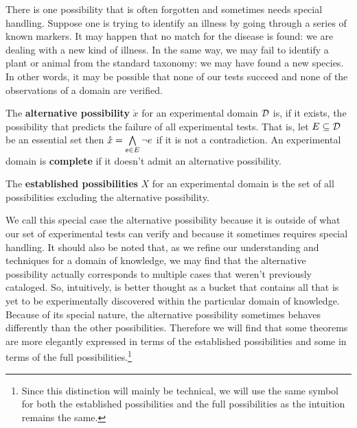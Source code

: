 \documentclass[11pt,letterpaper,fleqn]{memoir} %
\begin{document}
There is one possibility that is often forgotten and sometimes needs special handling. Suppose one is trying to identify an illness by going through a series of known markers. It may happen that no match for the disease is found: we are dealing with a new kind of illness. In the same way, we may fail to identify a plant or animal from the standard taxonomy: we may have found a new species. In other words, it may be possible that none of our tests succeed and none of the observations of a domain are verified.

\begin{mathSection}
	\begin{prop}
		The \textbf{alternative possibility} $\mathring{x}$ for an experimental domain $\edomain$ is, if it exists, the possibility that predicts the failure of all experimental tests. That is, let $E \subseteq \edomain$ be an essential set then  $\mathring{x} = \bigAND\limits_{\stmt[e] \in E} \NOT e$ if it is not a contradiction. An experimental domain is \textbf{complete} if it doesn't admit an alternative possibility.
	\end{prop}

	\begin{prop}
	The \textbf{established possibilities} $X$ for an experimental domain is the set of all possibilities excluding the alternative possibility.
\end{prop}
\end{mathSection}

We call this special case the alternative possibility because it is outside of what our set of experimental tests can verify and because it sometimes requires special handling. It should also be noted that, as we refine our understanding and techniques for a domain of knowledge, we may find that the alternative possibility actually corresponds to multiple cases that weren't previously cataloged. So, intuitively, is better thought as a bucket that contains all that is yet to be experimentally discovered within the particular domain of knowledge. Because of its special nature, the alternative possibility sometimes behaves differently than the other possibilities. Therefore we will find that some theorems are more elegantly expressed in terms of the established possibilities and some in terms of the full possibilities.\footnote{Since this distinction will mainly be technical, we will use the same symbol for both the established possibilities and the full possibilities as the intuition remains the same.}
\end{document}
